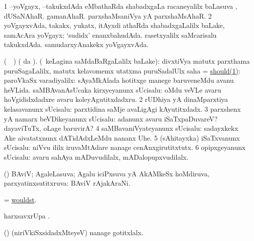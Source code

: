 \bentry
{} 
\gl{\saupa}
\expl{}
\bmng
\bnum
\num{1} --yoVgayx, --takukxdAda eMbathaRda shabadxgaLa racaneyalilx baLasuva \saupa, \udA\  dUSaNAhaR.  gamanAhaR.  parxshaMsaniVya yA parxshaMsAhaR. 
\num{2} yoVgayxvAda, takakx, yukatx, itAyxdi athaRda shabadxgaLalilx baLake, \udA\  samAcAra yoVgayx; `sudidx' enanxbahudAda.  rasetxyalilx saMcarisalu takukxdAda.  samudarxyAnakekx yoVgayxvAda. 
\enum
\emng
\eentry

\bentry
{} 
\gl{\kirx}
\bmng
(\parxpu\ \Eva\ ) ( \kirx da \BU). (\kanmu\ keLagina saMdaBaRgaLalilx baLake): 
\bnum
{} divxtiVya matutx parxthama puruSagaLalilx, matutx kelavomemx utatxma puruSadalUlx saha = \hyperref{kandict_s.pdf}{S}{should(1)}{should(1)}: 
\banum
{} paroVkaSx varadiyalilx:  sAyaMkAlada hotitxge manege baruveneMdu avanu heVLida. 
 saMBAvanAsUcaka kirxyeyanunx sUcisalu:  oMdu veVLe avaru hoVgididxdadxre avaru koleyAgutitxdadxru. 
\eanum
\numie
\num{2} rUDhiya yA dinaMparxtiya kelasavanunx sUcisalu:  parxtidina saMje avaLigAgi kAyutitxdadx. 
\num{3} parxshenx yA namarx beVDikeyanunx sUcisalu:  adanunx avaru iSaTxpaDuvareV?  dayaviTuTx, oLage baruvirA? 
\num{4} saMBavaniVyateyanunx sUcisalu:  sadayxkekx Ake aivatatxnunx dATidAdxLeMdu nananx Uhe. 
\num{5} (sAhitayxka) iSaTxvanunx sUcisalu:  niVvu ililx iruvaMtAdare nanage cenAnxgirutitxtutx. 
\num{6} opipxgeyanunx sUcisalu:  avaru sahAya mADuvudilalx, mADalopupxvudilalx. 
\enum
\emng
\eentry

\bentry
{} 
\gl{\gu}
\expl{}
\bmng
(\hiV) BAviV; AgaleLasuva; Agalu iciPxsuva yA AkAMkeSx hoMdiruva, parxyatinxsutitxruva:  BAviV rAjakAraNi. 
\emng
\eentry

\bentry
{} 
\gl{\kirx}
\expl{}
\bmng
= \hyperlink{wouldst}{wouldst}. 
\emng
\eentry

\bentry
{} 
\bmng
harxsavxrUpa . 
\emng

\noindent
\gl{\pagu}
\expl{}
\bmng
{} (\AmA) (niriVkiSxsidadxMteyeV) nanage gotitxlalx. 
\emng
\eentry

